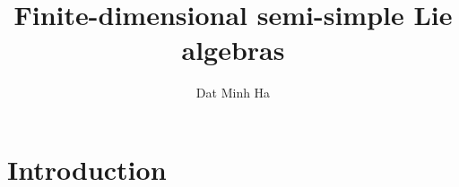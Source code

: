 

\setcounter{section}{-1}





    \title{Finite-dimensional semi-simple Lie algebras}
    
    \author{Dat Minh Ha}
    \maketitle
    
    \begin{abstract}
    
    \end{abstract}
    
    {
    \hypersetup{} 
    \tableofcontents %
    }

    \section{Introduction}

    

    

    
    
    \printbibliography

